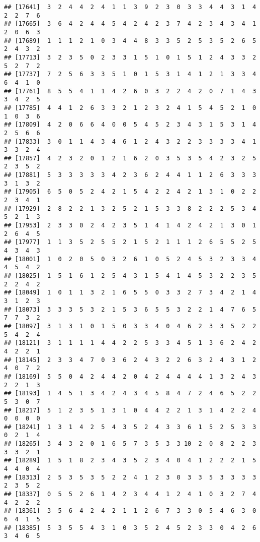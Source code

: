 \documentclass[
]{article}
\begin{document}
\begin{verbatim}
## [17641]  3  2  4  4  2  4  1  1  3  9  2  3  0  3  3  4  4  3  1  4  2  2  7  6
## [17665]  3  6  4  2  4  4  5  4  2  4  2  3  7  4  2  3  4  3  4  1  2  0  6  3
## [17689]  1  1  1  2  1  0  3  4  4  8  3  3  5  2  5  3  5  2  6  5  2  4  3  2
## [17713]  3  2  3  5  0  2  3  3  1  5  1  0  1  5  1  2  4  3  3  2  5  2  7  2
## [17737]  7  2  5  6  3  3  5  1  0  1  5  3  1  4  1  2  1  3  3  4  6  4  1  0
## [17761]  8  5  5  4  1  1  4  2  6  0  3  2  2  4  2  0  7  1  4  3  3  4  2  5
## [17785]  4  4  1  2  6  3  3  2  1  2  3  2  4  1  5  4  5  2  1  0  1  0  3  6
## [17809]  4  2  0  6  6  4  0  0  5  4  5  2  3  4  3  1  5  3  1  4  2  5  6  6
## [17833]  3  0  1  1  4  3  4  6  1  2  4  3  2  2  3  3  3  3  4  1  3  3  2  4
## [17857]  4  2  3  2  0  1  2  1  6  2  0  3  5  3  5  4  2  3  2  5  2  3  5  2
## [17881]  5  3  3  3  3  3  4  2  3  6  2  4  4  1  1  2  6  3  3  3  3  1  3  2
## [17905]  6  5  0  5  2  4  2  1  5  4  2  2  4  2  1  3  1  0  2  2  2  3  4  1
## [17929]  2  8  2  2  1  3  2  5  2  1  5  3  3  8  2  2  2  5  3  4  5  2  1  3
## [17953]  2  3  3  0  2  4  2  3  5  1  4  1  4  2  4  2  1  3  0  1  2  6  4  5
## [17977]  1  1  3  5  2  5  5  2  1  5  2  1  1  1  2  6  5  5  2  5  4  3  4  3
## [18001]  1  0  2  0  5  0  3  2  6  1  0  5  2  4  5  3  2  3  3  4  4  5  4  2
## [18025]  1  5  1  6  1  2  5  4  3  1  5  4  1  4  5  3  2  2  3  5  2  2  4  2
## [18049]  1  0  1  1  3  2  1  6  5  5  0  3  3  2  7  3  4  2  1  4  3  1  2  3
## [18073]  3  3  3  5  3  2  1  5  3  6  5  5  3  2  2  1  4  7  6  5  7  7  3  2
## [18097]  3  1  3  1  0  1  5  0  3  3  4  0  4  6  2  3  3  5  2  2  5  4  2  4
## [18121]  3  1  1  1  1  4  4  2  2  5  3  3  4  5  1  3  6  2  4  2  4  2  2  1
## [18145]  2  3  3  4  7  0  3  6  2  4  3  2  2  6  3  2  4  3  1  2  4  0  7  2
## [18169]  5  5  0  4  2  4  4  2  0  4  2  4  4  4  4  1  3  2  4  3  2  2  1  3
## [18193]  1  4  5  1  3  4  2  4  3  4  5  8  4  7  2  4  6  5  2  2  5  3  0  7
## [18217]  5  1  2  3  5  1  3  1  0  4  4  2  2  1  3  1  4  2  2  4  0  0  0  0
## [18241]  1  3  1  4  2  5  4  3  5  2  4  3  3  6  1  5  2  5  3  3  0  2  1  4
## [18265]  3  4  3  2  0  1  6  5  7  3  5  3  3 10  2  0  8  2  2  3  3  3  2  1
## [18289]  1  5  1  8  2  3  4  3  5  2  3  4  0  4  1  2  2  2  1  5  4  4  0  4
## [18313]  2  5  3  5  3  5  2  2  4  1  2  3  0  3  3  5  3  3  3  3  2  3  5  2
## [18337]  0  5  5  2  6  1  4  2  3  4  4  1  2  4  1  0  3  2  7  4  4  2  2  2
## [18361]  3  5  6  4  2  4  2  1  1  2  6  7  3  3  0  5  4  6  3  0  6  4  1  5
## [18385]  5  3  5  5  4  3  1  0  3  5  2  4  5  2  3  3  0  4  2  6  3  4  6  5

\end{verbatim}
\end{document}
